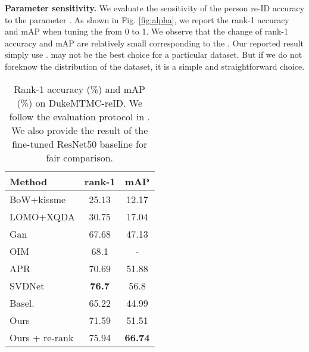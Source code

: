 \textbf{Parameter sensitivity.}
We evaluate the sensitivity of the person re-ID accuracy to the parameter . As shown in Fig. \ref{fig:alpha}, we report the rank-1 accuracy and mAP when tuning the  from 0 to 1. We observe that the change of rank-1 accuracy and mAP are relatively small corresponding to the . Our reported result simply use .  may not be the best choice for a particular dataset. But if we do not foreknow the distribution of the dataset, it is a simple and straightforward choice.

\setlength{\tabcolsep}{5pt}
\begin{table}
\begin{center}
\begin{tabular}{l|cc}
\hline
Method & rank-1 & mAP \\
\hline
BoW+kissme \cite{zheng2015scalable} & 25.13 & 12.17 \\
LOMO+XQDA \cite{liao2015person} & 30.75 & 17.04\\
Gan \cite{zheng2017unlabeled} & 67.68  & 47.13\\
OIM \cite{xiao2017joint} & 68.1 & - \\
APR \cite{lin2017improving} & 70.69 & 51.88 \\
SVDNet \cite{sun2017svdnet} & \textbf{76.7} & 56.8 \\
\hline
Basel. \cite{zheng2017unlabeled} & 65.22 & 44.99\\ 
Ours & 71.59 & 51.51 \\
Ours + re-rank  & 75.94 & \textbf{66.74} \\
\hline
\end{tabular}
\end{center}
\caption{Rank-1 accuracy (\%) and mAP (\%) on DukeMTMC-reID. We follow the evaluation protocol in \cite{zheng2017unlabeled}. We also provide the result of the fine-tuned ResNet50 baseline for fair comparison.}
\label{table:duke}
\end{table}

